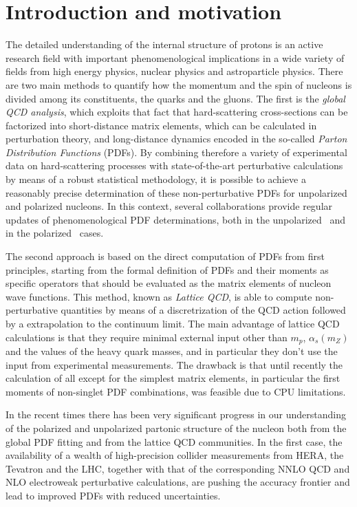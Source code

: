 \section{Introduction and motivation}

The detailed understanding of the internal structure of protons is an active
research field with important phenomenological implications in a wide variety of fields
from high energy physics, nuclear physics and astroparticle physics.
%
There are two main methods to quantify how the momentum and the spin of nucleons
is divided among its constituents, the quarks and the gluons.
%
The first is the {\it global QCD analysis}, which exploits that fact that hard-scattering
cross-sections can be factorized into short-distance matrix elements, which can
be calculated in perturbation theory, and long-distance dynamics encoded in the
so-called {\it Parton Distribution Functions} (PDFs).
%
By combining therefore a variety of experimental data on hard-scattering processes
with state-of-the-art perturbative calculations by means of a robust statistical
methodology, it is possible to achieve a reasonably precise determination
of these non-perturbative PDFs for unpolarized and polarized nucleons.
%
In this context, several collaborations provide regular updates of
phenomenological PDF determinations, both
in the unpolarized~\cite{Ball:2012cx,Ball:2014uwa,Harland-Lang:2014zoa,
Dulat:2015mca,Alekhin:2017kpj,Owens:2012bv} and in
the polarized~\cite{Nocera:2014gqa,deFlorian:2009vb} cases.

The second approach is based on the direct computation of PDFs from first principles,
starting from the formal definition of PDFs and their moments as specific operators that
should be evaluated as the matrix elements of nucleon wave functions.
%
This method, known as {\it Lattice QCD}, is able to compute non-perturbative quantities
by means of a discretrization of the QCD action followed by a extrapolation
to the continuum limit.
%
The main advantage of lattice QCD calculations is that they require minimal external input
other than $m_p$, $\alpha_s(m_Z)$ and the values of the heavy quark masses, and in particular
they don't use the input from experimental measurements.
%
The drawback is that until recently the calculation of all except for the simplest
matrix elements, in particular the first moments of non-singlet PDF combinations,
was feasible due to CPU limitations.

In the recent times there has been very significant progress in our understanding
of the polarized and unpolarized partonic structure of the nucleon both
from the global PDF fitting and from the lattice QCD communities.
%
In the first case, the availability of a wealth of high-precision collider measurements
from HERA, the Tevatron and the LHC, together with that of the corresponding
NNLO QCD and NLO electroweak perturbative calculations, are pushing the
accuracy frontier and lead to improved PDFs with reduced uncertainties.

